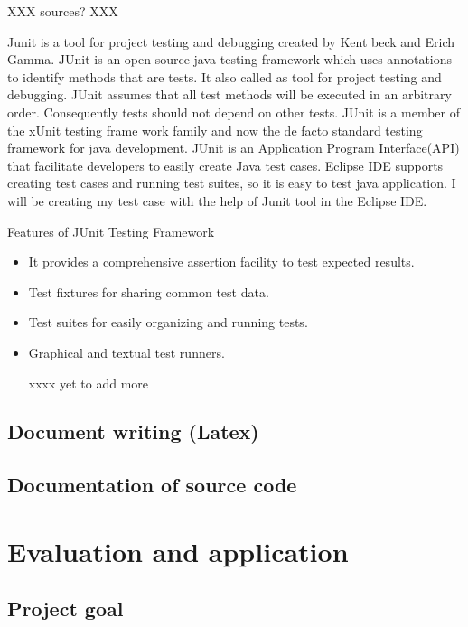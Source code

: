 \documentclass{article}
\begin{document}
XXX sources? XXX

Junit is a tool for project testing and debugging created by Kent beck and Erich Gamma.
JUnit is an open source java testing framework which uses annotations to identify methods that are tests. It also called as tool for project testing and debugging. JUnit assumes that all test methods will be executed in an arbitrary order. Consequently tests should not depend on other tests.
JUnit is a member of the xUnit testing frame work family and now the de facto standard testing framework for java development. JUnit is an Application Program Interface(API) that facilitate developers to easily create Java test cases. 
Eclipse IDE supports creating test cases and running test suites, so it is easy to test java application.
I will be creating my test case with the help of Junit tool in the Eclipse IDE. 

Features of JUnit Testing Framework
\begin{itemize}

\item It provides a comprehensive assertion facility to test expected results.
\item Test fixtures for sharing common test data.
\item Test suites for easily organizing and running tests.
\item Graphical and textual test runners.

xxxx yet to add more 

\end{itemize}

\subsection{Document writing (Latex)}
\label{sec:latex}





\subsection{Documentation of source code}
\label{sec:documentsource}


\section{Evaluation and application}
\label{sec:eval}

\subsection{Project goal}
\label{sec:goal}
\end{document}
